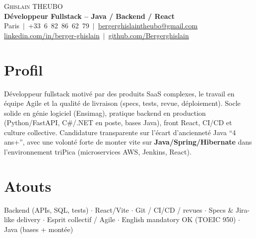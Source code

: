 \documentclass[a4paper,10.5pt]{article}
\begin{document}
\begin{center}
{\Huge \scshape Ghislain THEUBO}\\[3pt]
\textbf{D\'eveloppeur Fullstack -- Java / Backend / React}\\[3pt]
\small Paris $\,|\,$ +33~6~82~86~62~79 $\,|\,$ \href{mailto:bergerghislaintheubo@gmail.com}{bergerghislaintheubo@gmail.com}\\[1pt]
\href{https://www.linkedin.com/in/berger-ghislain}{linkedin.com/in/berger-ghislain} $\,|\,$ \href{https://github.com/Bergerghislain}{github.com/Bergerghislain}
\end{center}

\section{Profil}
\small{
D\'eveloppeur fullstack motiv\'e par des produits SaaS complexes, le travail en \'equipe Agile et la qualit\'e de livraison
(specs, tests, revue, d\'eploiement). Socle solide en g\'enie logiciel (Ensimag), pratique backend en production
(Python/FastAPI, C\#/.NET en poste, bases Java), front React, CI/CD et culture collective.
Candidature transparente sur l'\'ecart d'anciennet\'e Java ``4 ans+'', avec une volont\'e forte de monter vite sur
\textbf{Java/Spring/Hibernate} dans l'environnement triPica (microservices AWS, Jenkins, React).
}

\section{Atouts}
\small{
Backend (APIs, SQL, tests) $\cdot$ React/Vite $\cdot$ Git / CI/CD / revues $\cdot$
Specs \& Jira-like delivery $\cdot$ Esprit collectif / Agile $\cdot$ English mandatory OK (TOEIC 950) $\cdot$ Java (bases + mont\'ee)
}
\end{document}
